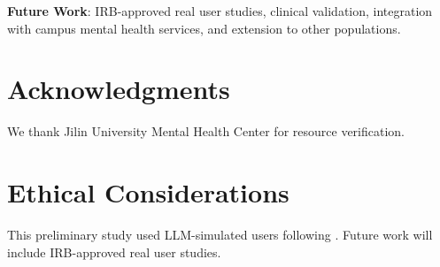 \documentclass[preprint,12pt]{elsarticle}
\begin{document}
\textbf{Future Work}: IRB-approved real user studies, clinical validation,
integration with campus mental health services, and extension to other populations.

\section*{Acknowledgments}

We thank Jilin University Mental Health Center for resource verification.

\section*{Ethical Considerations}

This preliminary study used LLM-simulated users following \citet{horton2023llm}.
Future work will include IRB-approved real user studies.



\end{document}
